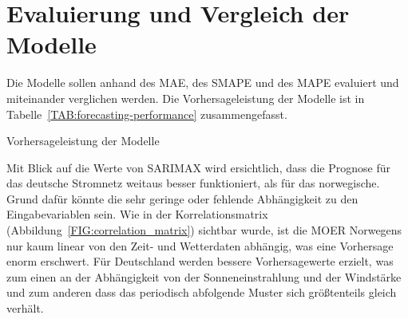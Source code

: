 \section{Evaluierung und Vergleich der Modelle}
Die Modelle sollen anhand des \ac{MAE}, des \ac{SMAPE} und des \ac{MAPE} evaluiert und miteinander verglichen werden.
Die Vorhersageleistung der Modelle ist in Tabelle~\ref{TAB:forecasting-performance} zusammengefasst.
\begin{table}[ht]
 \centering
 \caption{Vorhersageleistung der Modelle}
 \label{TAB:forecasting-performance}
 
\end{table}
Mit Blick auf die Werte von \ac{SARIMAX} wird ersichtlich, dass die Prognose für das deutsche Stromnetz weitaus besser funktioniert, als für das norwegische.
Grund dafür könnte die sehr geringe oder fehlende Abhängigkeit zu den Eingabevariablen sein.
Wie in der Korrelationsmatrix (Abbildung~\ref{FIG:correlation_matrix}) sichtbar wurde, ist die \ac{MOER} Norwegens nur kaum linear von den Zeit- und Wetterdaten abhängig, was eine Vorhersage enorm erschwert.
Für Deutschland werden bessere Vorhersagewerte erzielt, was zum einen an der Abhängigkeit von der Sonneneinstrahlung und der Windstärke und zum anderen dass das periodisch abfolgende Muster sich größtenteils gleich verhält.

